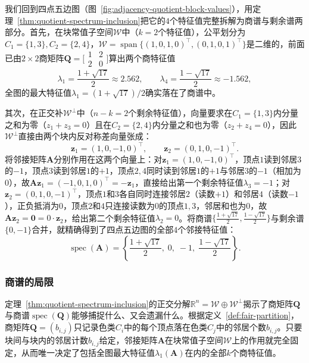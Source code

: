 我们回到四点五边图（图~\ref{fig:adjacency-quotient-block-values}），用定理~\ref{thm:quotient-spectrum-inclusion}把它的$4$个特征值完整拆解为商谱与剩余谱两部分。首先，在块常值子空间$\mathcal W$中（$k=2$个特征值），公平划分为$C_1=\{1,3\},C_2=\{2,4\}$，$\mathcal W=\operatorname{span}\{(1,0,1,0)^\top,(0,1,0,1)^\top\}$是二维的，前面已由$2\times 2$商矩阵$\bm Q=\bigl[\begin{smallmatrix}1&2\\2&0\end{smallmatrix}\bigr]$算出两个商特征值
\[
\lambda_1=\frac{1+\sqrt{17}}{2}\approx 2.562,\qquad
\lambda_4=\frac{1-\sqrt{17}}{2}\approx -1.562,
\]
全图的最大特征值$\lambda_1=(1+\sqrt{17})/2$确实落在了商谱中。

其次，在正交补$\mathcal W^\perp$中（$n-k=2$个剩余特征值），向量要求在$C_1=\{1,3\}$内分量之和为零（$z_1+z_3=0$）且在$C_2=\{2,4\}$内分量之和也为零（$z_2+z_4=0$），因此$\mathcal W^\perp$直接由两个块内反对称差向量张成：
\[
\bm z_1=(1,0,-1,0)^\top,\qquad
\bm z_2=(0,1,0,-1)^\top.
\]
将邻接矩阵$\bm A$分别作用在这两个向量上：对$\bm z_1=(1,0,-1,0)^\top$，顶点$1$读到邻居$3$的$-1$，顶点$3$读到邻居$1$的$+1$，顶点$2,4$同时读到邻居$1$的$+1$与邻居$3$的$-1$（相加为$0$），故$\bm A\bm z_1=(-1,0,1,0)^\top=-\bm z_1$，直接给出第一个剩余特征值$\lambda_3=-1$；对$\bm z_2=(0,1,0,-1)^\top$，顶点$1$和$3$各自同时连接邻居$2$（读数$+1$）和邻居$4$（读数$-1$），正负抵消为$0$，顶点$2$和$4$只连接读数为$0$的顶点$1,3$，邻居和也为$0$，故$\bm A\bm z_2=\bm 0=0\cdot\bm z_2$，给出第二个剩余特征值$\lambda_2=0$。将商谱$\bigl\{\frac{1+\sqrt{17}}{2},\frac{1-\sqrt{17}}{2}\bigr\}$与剩余谱$\{0,-1\}$合并，就精确得到了四点五边图的全部$4$个邻接特征值：
\[
\operatorname{spec}(\bm A)=\left\{\frac{1+\sqrt{17}}{2},\;0,\;-1,\;\frac{1-\sqrt{17}}{2}\right\}.
\]

\subsubsection{商谱的局限}
\label{sec:adjacency-quotient-information}

定理~\ref{thm:quotient-spectrum-inclusion}的正交分解$\mathbb R^n=\mathcal W\oplus\mathcal W^\perp$揭示了商矩阵$\bm Q$与商谱$\operatorname{spec}(\bm Q)$能够捕捉什么、又会遗漏什么。根据定义~\ref{def:fair-partition}，商矩阵$\bm Q=(b_{i,j})$只记录色类$C_i$中的每个顶点落在色类$C_j$中的邻居个数$b_{i,j}$。只要块间与块内的邻居计数$b_{i,j}$给定，邻接矩阵$\bm A$在块常值子空间$\mathcal W$上的作用就完全固定，从而唯一决定了包括全图最大特征值$\lambda_1(\bm A)$在内的全部$k$个商特征值。

